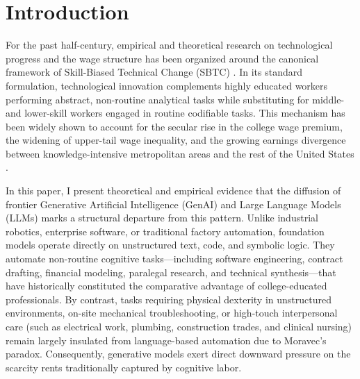 \documentclass[12pt]{article}
\begin{document}
\newpage

\section{Introduction}
\label{sec:introduction}

For the past half-century, empirical and theoretical research on technological progress and the wage structure has been organized around the canonical framework of Skill-Biased Technical Change (SBTC) \citep{tinbergen1974, katzMurphy1992, acemoglu1998, autor2003, goldinKatz2008, acemogluAutor2011}. In its standard formulation, technological innovation complements highly educated workers performing abstract, non-routine analytical tasks while substituting for middle- and lower-skill workers engaged in routine codifiable tasks. This mechanism has been widely shown to account for the secular rise in the college wage premium, the widening of upper-tail wage inequality, and the growing earnings divergence between knowledge-intensive metropolitan areas and the rest of the United States \citep{autor2008, moretti2012, acemogluRestrepo2022}.

In this paper, I present theoretical and empirical evidence that the diffusion of frontier Generative Artificial Intelligence (GenAI) and Large Language Models (LLMs) marks a structural departure from this pattern. Unlike industrial robotics, enterprise software, or traditional factory automation, foundation models operate directly on unstructured text, code, and symbolic logic. They automate non-routine cognitive tasks---including software engineering, contract drafting, financial modeling, paralegal research, and technical synthesis---that have historically constituted the comparative advantage of college-educated professionals. By contrast, tasks requiring physical dexterity in unstructured environments, on-site mechanical troubleshooting, or high-touch interpersonal care (such as electrical work, plumbing, construction trades, and clinical nursing) remain largely insulated from language-based automation due to Moravec's paradox. Consequently, generative models exert direct downward pressure on the scarcity rents traditionally captured by cognitive labor.
\end{document}
